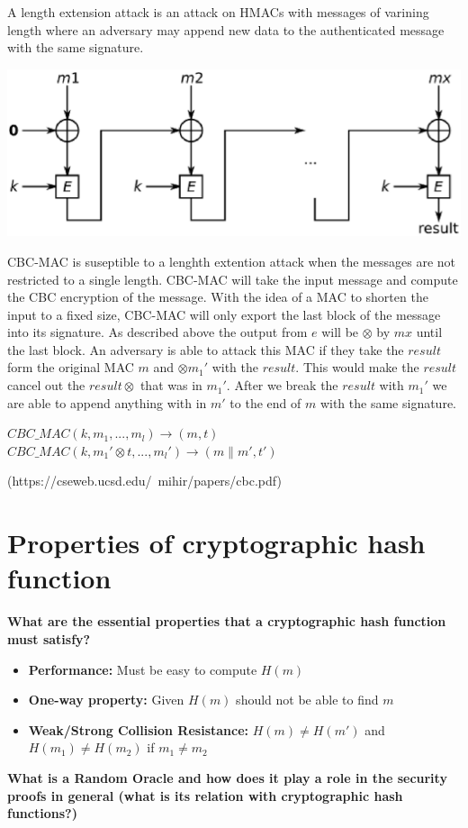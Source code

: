 \documentclass[letterpaper,11pt,notitlepage,fleqn]{article}
\begin{document}
A length extension attack is an attack on HMACs with messages of varining length where an adversary may append new data to the authenticated message with the same signature. 
\begin{center}
    \includegraphics{cbcmac.eps}\\[1cm] %
\end{center}
\indent CBC-MAC is suseptible to a lenghth extention attack when the messages are not restricted to a single length. CBC-MAC will take the input message and compute the CBC encryption of the message. With the idea of a MAC to shorten the input to a fixed size, CBC-MAC will only export the last block of the message into its signature. As described above the output from $e$ will be $\otimes$ by $mx$ until the last block. An adversary is able to attack this MAC if they take the $result$ form
the original MAC $m$ and $\otimes m_{1}'$ with the $result$. This would make the $result$ cancel out the $result \otimes$ that was in $m_{1}'$. After we break the $result$ with $m_{1}'$ we are able to append anything with in $m'$ to the end of $m$ with the same signature.
\begin{center}
    $CBC\_MAC(k,m_{1},..., m_{l}) \rightarrow (m,t)$ \\ $CBC\_MAC(k,m_{1}' \otimes t, ..., m_{l}') \rightarrow (m\|m',t')$
\end{center}
(https://cseweb.ucsd.edu/~mihir/papers/cbc.pdf)

\section{Properties of cryptographic hash function}
\noindent \textbf{What are the essential properties that a cryptographic hash function must satisfy?}
\begin{itemize}
    \item \textbf{Performance:} Must be easy to compute $H(m)$
    \item \textbf{One-way property:} Given $H(m)$ should not be able to find $m$
    \item \textbf{Weak/Strong Collision Resistance:} $H(m) \neq H(m')$ and $H(m_{1}) \neq H(m_{2})$ if $m_{1} \neq m_{2}$
\end{itemize}
\noindent \textbf{What is a Random Oracle and how does it play a role in the security proofs in general 
(what is its relation with cryptographic hash functions?)}

\medskip
 


\end{document}
